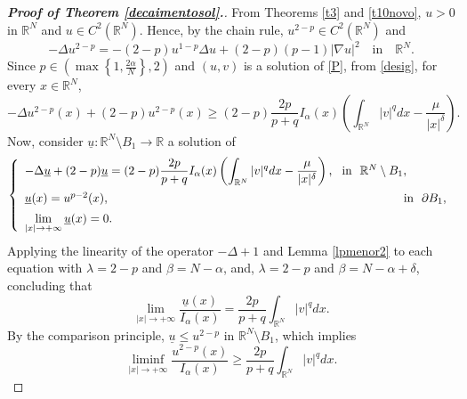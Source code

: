 \documentclass[12pt,a4paper]{article}
\numberwithin{equation}{section}
\begin{document}
\begin{proof}[\textbf{Proof of Theorem \ref{decaimentosol}.}]
\medbreak
From Theorems \ref{t3} and \ref{t10novo}, $u>0$ in $\mathbb{R}^N$ and $u\in C^2(\mathbb{R}^N)$. Hence, by the chain rule, $u^{2-p}\in C^2(\mathbb{R}^N)$ and
$$
-\Delta u^{2-p} = -(2-p)u^{1-p}\Delta u +(2-p)(p-1)|\nabla u|^2 \quad \text{in} \quad \mathbb{R}^N.
$$
Since $p\in \left(\max\left\{1, \frac{2\alpha}{N}\right\}, 2\right)$ and $(u, v)$ is a solution of \eqref{P}, from \eqref{desig}, for every $x\in \mathbb{R}^N$,
$$
-\Delta u^{2-p}(x)+(2-p)u^{2-p}(x) \geq (2-p)\dfrac{2p}{p+q}I_\alpha (x) \left(\int_{\mathbb{R}^N} |v|^q dx -\dfrac{\mu}{|x|^\delta}\right).
$$
Now, consider $\underline{u}:\mathbb{R}^N \setminus B_1 \rightarrow \mathbb{R}$ a solution of
$$
\left\{
\begin{array}{lll}
     -\Delta \underline{u} + (2-p)\underline{u} = (2-p)\dfrac{2p}{p+q}I_\alpha (x) \left(\displaystyle\int_{\mathbb{R}^N} |v|^q dx -\dfrac{\mu}{|x|^\delta}\right), \mbox{ \ in \ } \mathbb{R}^N \setminus B_1, \vspace{5pt}\\
     \underline{u}(x)=u^{p-2}(x), \ \ \ \ \ \ \ \ \ \ \ \ \ \ \ \ \ \ \ \ \ \ \ \ \ \ \ \ \ \ \ \ \ \ \ \ \ \ \ \ \ \ \ \ \ \ \ \ \ \ \ \ \ \ \ \ \ \ \ \ \ \ \ \ \ \ \ \ \ \ \ \ \mbox{ \ in \ } \partial B_1, \vspace{5pt}\\
     \lim\limits_{|x|\rightarrow +\infty}\underline{u}(x)=0.
\end{array}
\right.
$$
Applying the linearity of the operator $-\Delta +1$ and Lemma \ref{lpmenor2} to each equation with $\lambda=2-p$ and $\beta=N-\alpha$, and, $\lambda=2-p$ and $\beta=N-\alpha+\delta$, concluding that
$$
\lim\limits_{|x|\rightarrow +\infty}\dfrac{\underline{u}(x)}{I_\alpha(x)}= \dfrac{2p}{p+q}\int_{\mathbb{R}^N}|v|^q dx.
$$
By the comparison principle, $\underline{u}\leq u^{2-p}$ in $\mathbb{R}^N \setminus B_1$, which implies
\begin{equation}\label{subsol}
    \liminf\limits_{|x|\rightarrow +\infty}\dfrac{u^{2-p}(x)}{I_\alpha(x)}\geq \dfrac{2p}{p+q}\int_{\mathbb{R}^N} |v|^q dx.
\end{equation}


\end{proof}
\end{document}
